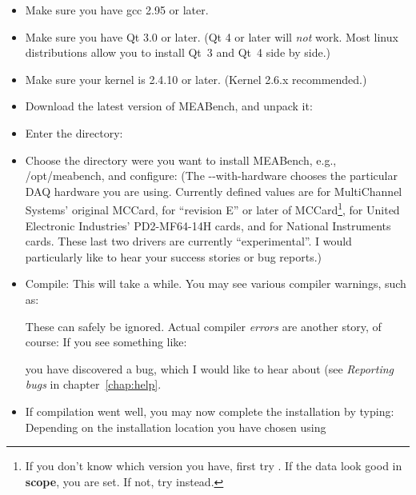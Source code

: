 \documentclass[12pt,oneside]{book}
\def\meabench{{MEABench}\xspace}
\def\prog#1{{\bf #1}}
\def\filename#1{{\sf #1}\xspace}
\begin{document}
\begin{itemize}
\item Make sure you have gcc 2.95 or later.
\item Make sure you have Qt 3.0 or later. (Qt 4 or later will \emph{not} work. Most linux distributions allow you to install Qt~3 and Qt~4 side by side.)
\item Make sure your kernel is 2.4.10 or later. (Kernel 2.6.x recommended.)
\item Download the latest version of \meabench, and unpack it:
\item Enter the directory:
\item Choose the directory were you want to install \meabench, e.g.,
  \filename{/opt/meabench}, and configure:
(The \filename{-{}-with-hardware} chooses the particular DAQ hardware
you are using. Currently defined values are  for MultiChannel
Systems' original MCCard,  for ``revision E'' or later of
MCCard\footnote{If you don't know which version you have, first try
  . If the data look good in \prog{scope}, you are set. If
  not, try  instead.},  for United Electronic Industries'
PD2-MF64-14H cards, and  for National Instruments
cards. These last two drivers are currently ``experimental''. I would
particularly like to hear your success stories or bug reports.)
\item Compile:
This will take a while. You may see various compiler warnings, such
as: 
\begin{quotation}\end{quotation}
These can safely be ignored. Actual compiler {\it errors} are another story,
of course: If you see something like:
\begin{quotation}\end{quotation}
you have discovered a bug, which I would like to hear about (see
\emph{Reporting bugs} in chapter~\ref{chap:help}.
\item If compilation went well, you may now complete the installation
by typing:
Depending on the installation location you have chosen using

\end{itemize}
\end{document}
